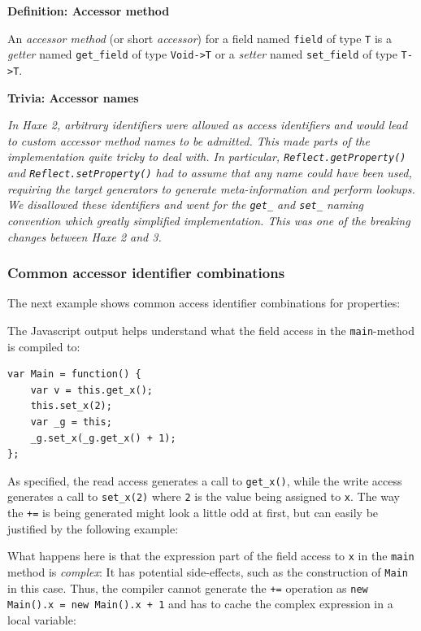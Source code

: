 \documentclass{article}
\newcommand{\target}[1]{#1}
\newcommand{\type}[1]{\texttt{#1}}
\newcommand{\expr}[1]{\texttt{#1}}
\newenvironment{myshaded}
  {\def\FrameCommand{\fboxsep=\topsep\colorbox{bgcolor}}%
  \MakeFramed {\advance\hsize-\width \FrameRestore}}%
 {\endMakeFramed}
\newcommand{\define}[3][Definition]
	{\begin{myshaded}\noindent\textbf{#1: #2}\par\nobreak\noindent\ignorespaces#3\label{def:#2}\end{myshaded}}
\newcommand{\trivia}[2]
	{\begin{myshaded}\noindent\textbf{Trivia: #1}\par\nobreak\noindent\ignorespaces\textit{#2}\end{myshaded}}
\begin{document}
\define{Accessor method}{An \emph{accessor method} (or short \emph{accessor}) for a field named \expr{field} of type \type{T} is a \emph{getter} named \expr{get_field} of type \type{Void->T} or a \emph{setter} named \expr{set_field} of type \type{T->T}.}

\trivia{Accessor names}{In Haxe 2, arbitrary identifiers were allowed as access identifiers and would lead to custom accessor method names to be admitted. This made parts of the implementation quite tricky to deal with. In particular, \expr{Reflect.getProperty()} and \expr{Reflect.setProperty()} had to assume that any name could have been used, requiring the target generators to generate meta-information and perform lookups.\\
We disallowed these identifiers and went for the \expr{get_} and \expr{set_} naming convention which greatly simplified implementation. This was one of the breaking changes between Haxe 2 and 3.}

\subsubsection{Common accessor identifier combinations}

The next example shows common access identifier combinations for properties:



The \target{Javascript} output helps understand what the field access in the \expr{main}-method is compiled to:

\begin{lstlisting}
var Main = function() {
	var v = this.get_x();
	this.set_x(2);
	var _g = this;
	_g.set_x(_g.get_x() + 1);
};
\end{lstlisting}

As specified, the read access generates a call to \expr{get_x()}, while the write access generates a call to \expr{set_x(2)} where \expr{2} is the value being assigned to \expr{x}. The way the \expr{+=} is being generated might look a little odd at first, but can easily be justified by the following example:



What happens here is that the expression part of the field access to \expr{x} in the \expr{main} method is \emph{complex}: It has potential side-effects, such as the construction of \type{Main} in this case. Thus, the compiler cannot generate the \expr{+=} operation as \expr{new Main().x = new Main().x + 1} and has to cache the complex expression in a local variable:
\end{document}
